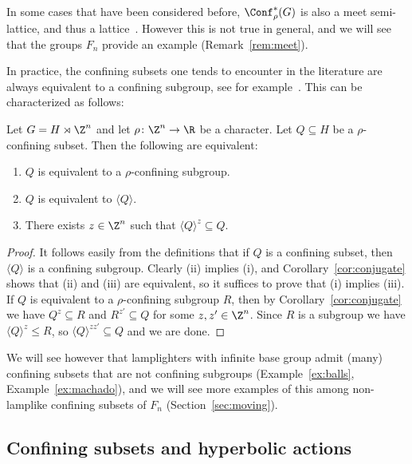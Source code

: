 \begin{rema}
In some cases that have been considered before, $\Conf^\ast_\rho(G)$ is also a meet semi-lattice, and thus a lattice~\cite{sahana:wreath, AR:BS, ABR2}. However this is not true in general, and we will see that the groups $F_n$ provide an example (Remark~\ref{rem:meet}).
\end{rema}

In practice, the confining subsets one tends to encounter in the literature are always equivalent to a confining subgroup, see for example~\cite{caprace15, sahana:wreath, AR:BS, ABR2}. This can be characterized as follows:

\begin{prop}\label{prop:equiv_to_subgroup}
Let $G=H\rtimes \Z^n$ and let $\rho\colon \Z^n \to\R$ be a character. Let $Q\subseteq H$ be a $\rho$-confining subset. Then the following are equivalent:
\begin{enumerate}
    \item $Q$ is equivalent to a $\rho$-confining subgroup.
    \item $Q$ is equivalent to $\langle Q\rangle$.
    \item There exists $z\in \Z^n$ such that $\langle Q\rangle^z\subseteq Q$.
\end{enumerate}
\end{prop}

\begin{proof}
It follows easily from the definitions that if $Q$ is a confining subset, then $\langle Q \rangle$ is a confining subgroup. Clearly (ii) implies (i), and Corollary~\ref{cor:conjugate} shows that (ii) and (iii) are equivalent, so it suffices to prove that (i) implies (iii). If $Q$ is equivalent to a $\rho$-confining subgroup $R$, then by Corollary~\ref{cor:conjugate} we have $Q^z\subseteq R$ and $R^{z'}\subseteq Q$ for some $z,z'\in\Z^n$. Since $R$ is a subgroup we have $\langle Q\rangle^z\le R$, so $\langle Q\rangle^{zz'}\subseteq Q$ and we are done.
\end{proof}

We will see however that lamplighters with infinite base group admit (many) confining subsets that are not confining subgroups (Example~\ref{ex:balls}, Example~\ref{ex:machado}), and we will see more examples of this among non-lamplike confining subsets of $F_n$ (Section~\ref{sec:moving}).


\subsection{Confining subsets and hyperbolic actions}\label{ssec:conf_hyp}

